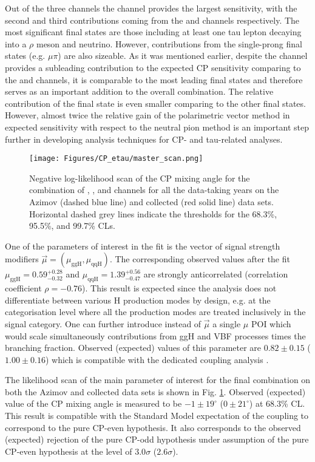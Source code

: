 Out of the three channels the \tata channel provides the largest sensitivity, with the second and third contributions coming from the \mt and \et channels respectively. The most significant final states are those including at least one tau lepton decaying into a $\rho$ meson and neutrino. However, contributions from the single-prong final states (e.g. $\mu\pi$) are also sizeable. As it was mentioned earlier, despite the \et channel provides a subleading contribution to the expected CP sensitivity comparing to the \mt and \tata channels, it is comparable to the most leading final states and therefore serves as an important addition to the overall combination. The relative contribution of the \aaa final state is even smaller comparing to the other final states. However, almost twice the relative gain of the polarimetric vector method in expected sensitivity with respect to the neutral pion method is an important step further in developing analysis techniques for CP- and tau-related analyses.

\begin{figure}[h!]
    \centering
    \texttt{[image: Figures/CP\_etau/master\_scan.png]}
    \caption{Negative log-likelihood scan of the CP mixing angle \mixa for the combination of \mt, \et, and \tata channels for all the data-taking years on the Azimov (dashed blue line) and collected (red solid line) data sets. Horizontal dashed grey lines indicate the thresholds for the 68.3\%, 95.5\%, and 99.7\% CLs.}
    \label{fig:master_scan}
\end{figure}

One of the parameters of interest in the fit is the vector of signal strength modifiers $\vec{\mu} = (\mu_\text{ggH}, \mu_\text{qqH})$. The corresponding observed values after the fit $\mu_\text{ggH} = 0.59^{+0.28}_{-0.32}$ and $\mu_\text{qqH} = 1.39^{+0.56}_{-0.47}$ are strongly anticorrelated (correlation coefficient $\rho = -0.76$). This result is expected since the analysis does not differentiate between various H production modes by design, e.g. at the categorisation level where all the production modes are treated inclusively in the signal category. One can further introduce instead of $\vec{\mu}$ a single $\mu$ POI which would scale simultaneously contributions from ggH and VBF processes times the \htt branching fraction. Observed (expected) values of this parameter are $0.82 \pm 0.15$ ($1.00 \pm 0.16$) which is compatible with the dedicated \htt coupling analysis \cite{CMS:2022kdi}. 

The likelihood scan of the main parameter of interest \mixa for the final combination on both the Azimov and collected data sets is shown in Fig. \ref{fig:master_scan}. Observed (expected) value of the CP mixing angle is measured to be $-1\pm19^\circ$ ($0\pm21^\circ$) at 68.3\% CL. This result is compatible with the Standard Model expectation of the \htt coupling to correspond to the pure CP-even hypothesis. It also corresponds to the observed (expected) rejection of the pure CP-odd hypothesis under assumption of the pure CP-even hypothesis at the level of $3.0\sigma$ ($2.6\sigma$). 

